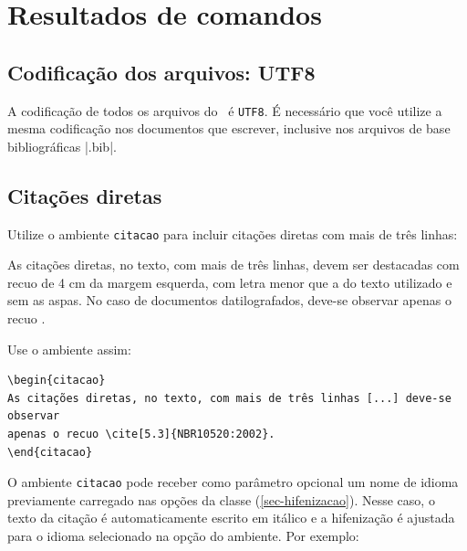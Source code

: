  
\chapter{Resultados de comandos}\label{cap_exemplos}


\section{Codificação dos arquivos: UTF8}

A codificação de todos os arquivos do \abnTeX\ é \texttt{UTF8}. É necessário que
você utilize a mesma codificação nos documentos que escrever, inclusive nos
arquivos de base bibliográficas |.bib|.

\section{Citações diretas}
\label{sec-citacao}

Utilize o ambiente \texttt{citacao} para incluir
citações diretas com mais de três linhas:

\begin{citacao}
As citações diretas, no texto, com mais de três linhas, devem ser
destacadas com recuo de 4 cm da margem esquerda, com letra menor que a do texto
utilizado e sem as aspas. No caso de documentos datilografados, deve-se
observar apenas o recuo \cite[5.3]{NBR10520:2002}.
\end{citacao}

Use o ambiente assim:

\begin{verbatim}
\begin{citacao}
As citações diretas, no texto, com mais de três linhas [...] deve-se observar
apenas o recuo \cite[5.3]{NBR10520:2002}.
\end{citacao}
\end{verbatim}

O ambiente \texttt{citacao} pode receber como parâmetro opcional um nome de
idioma previamente carregado nas opções da classe (\autoref{sec-hifenizacao}). Nesse
caso, o texto da citação é automaticamente escrito em itálico e a hifenização é
ajustada para o idioma selecionado na opção do ambiente. Por exemplo:

